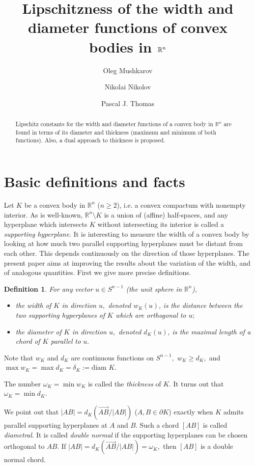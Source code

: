 \documentclass[a4paper,12pt]{amsart}
\title{Lipschitzness of the width and diameter functions of convex bodies in $\R^n$}
\author{Oleg Mushkarov}
\author{Nikolai Nikolov}
\author{Pascal J. Thomas}
\newtheorem{definition}[thm]{Definition}
\def\R{\mathbb R}
\def\om{\omega}
\def\d{\delta}
\begin{document}
\begin{abstract} Lipschitz constants for the width and diameter functions of a convex body in
$\R^n$ are found in terms of its diameter and thickness (maximum
and minimum of both functions). Also, a dual approach to thickness
is proposed.
\end{abstract}

\maketitle

\section{Basic definitions and facts}

Let $K$ be a convex body in $\R^n$ ($n\ge 2$), i.e. a convex
compactum with nonempty interior. As is well-known, $\R^n\setminus
K$ is a union of (affine) half-spaces, and any hyperplane which
intersects $K$ without intersecting its interior is called a
\emph{supporting hyperplane}. It is interesting to measure the
width of a convex body by looking at how much two parallel
supporting hyperplanes must be distant from each other. This
depends continuously on the direction of those hyperplanes. The
present paper aims at improving the results about the
variation of the width, and of analogous quantities. First we give
more precise definitions.

\begin{definition}
For any vector $u\in S^{n-1}$ (the unit sphere in $\R^n$),
\begin{itemize}
\item
the \emph{width} of $K$ in direction $u,$
denoted $w_K(u)$, is the distance between
the two supporting hyperplanes of $K$ which are orthogonal to $u;$
\item
the \emph{diameter} of $K$ in direction $u,$ denoted $d_K(u)$, is the maximal length of a
chord of $K$ parallel to $u.$
\end{itemize}
\end{definition}

Note that $w_K$ and $d_K$ are continuous functions on $S^{n-1},$
$w_K\ge d_K,$ and $\max w_K=\max d_K=\d_K:=\mbox{diam }K.$

The number $\om_K=\min w_K$ is called the \emph{thickness} of $K.$
It turns out that $\om_K=\min d_K.$

We point out that $|AB|=d_K(\overrightarrow{AB}/|AB|)$ ($A,
B\in\partial K$) exactly when $K$ admits parallel supporting
hyperplanes at $A$ and $B.$ Such a chord $[AB]$ is called
\emph{diametral}. It is called \emph{double normal} if the
supporting hyperplanes can be chosen orthogonal to $AB.$ If
$|AB|=d_K(\overrightarrow{AB}/|AB|)=\om_K,$ then $[AB]$ is a
double normal chord.
\end{document}
